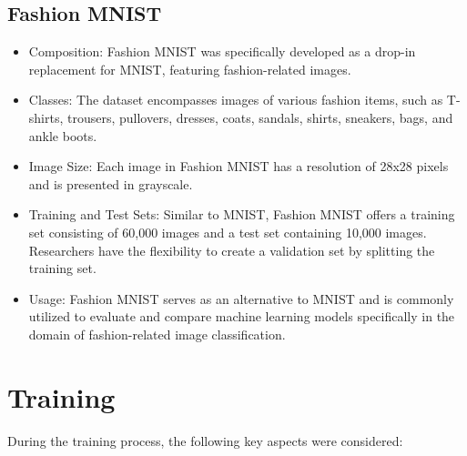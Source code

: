 \documentclass{midl} %
\begin{document}
\subsection{Fashion MNIST}
\begin{itemize}
  \item Composition: Fashion MNIST was specifically developed as a drop-in replacement for MNIST, featuring fashion-related images.
  \item Classes: The dataset encompasses images of various fashion items, such as T-shirts, trousers, pullovers, dresses, coats, sandals, shirts, sneakers, bags, and ankle boots.
  \item Image Size: Each image in Fashion MNIST has a resolution of 28x28 pixels and is presented in grayscale.
  \item Training and Test Sets: Similar to MNIST, Fashion MNIST offers a training set consisting of 60,000 images and a test set containing 10,000 images. Researchers have the flexibility to create a validation set by splitting the training set.
  \item Usage: Fashion MNIST serves as an alternative to MNIST and is commonly utilized to evaluate and compare machine learning models specifically in the domain of fashion-related image classification.
\end{itemize}

\section{Training}

During the training process, the following key aspects were considered:
\end{document}
